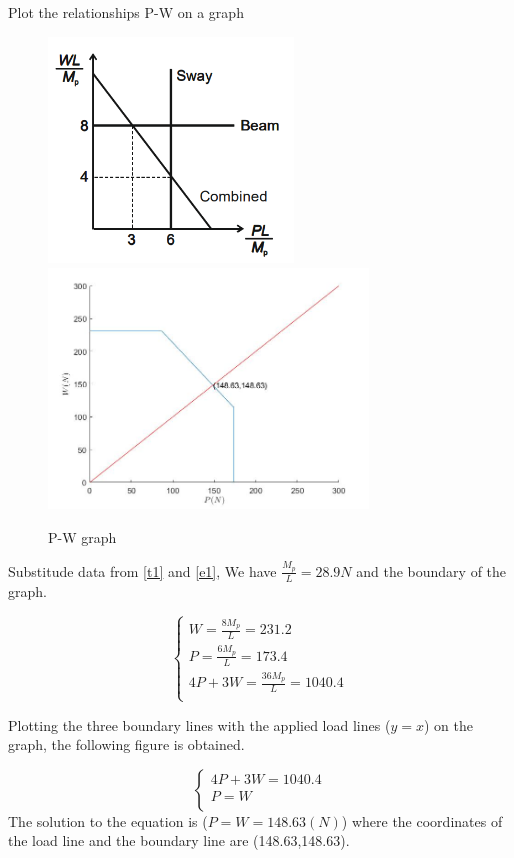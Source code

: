 Plot the relationships P-W on a graph

\begin{figure}[htbp]
    \centering
    \includegraphics[width=6.5cm]{./fig/14.png}
    \includegraphics[width=8.5cm]{./fig/15.jpg}
    \caption{P-W graph}
    \label{f3}
\end{figure}



Substitude data from \autoref{t1} and \autoref{e1}, We have $\frac{M_p}{L}=28.9N$ and the boundary of the graph.

$$
\left\{ \begin{array}{l}
	W=\frac{8M_p}{L}=231.2\\
	P=\frac{6M_p}{L}=173.4\\
	4P+3W=\frac{36M_p}{L}=1040.4\\
\end{array} \right. 
$$

Plotting the three boundary lines with the applied load lines ($y=x$) on the graph, the following figure is obtained.

$$
\left\{ \begin{array}{l}
	4P+3W=1040.4\\
	P=W\\
\end{array} \right. 
$$
The solution to the equation is ($P=W=148.63(N)$)
where the coordinates of the load line and the boundary line are (148.63,148.63\label{ee}).


\fi




